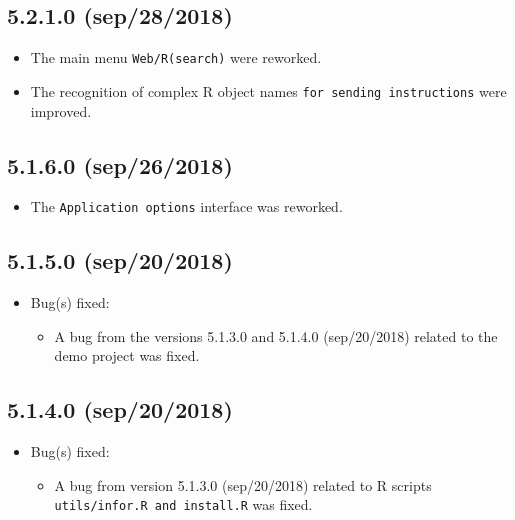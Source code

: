 \subsection*{5.2.1.0 (sep/28/2018)}
\begin{itemize}
  \item The main menu \texttt{Web/R(search)} were reworked.
  \item The recognition of complex R object names \texttt{for sending instructions} were improved.
\end{itemize}

\subsection*{5.1.6.0 (sep/26/2018)}
\begin{itemize}
  \item The \texttt{Application options} interface was reworked.
\end{itemize}

\subsection*{5.1.5.0 (sep/20/2018)}
\begin{itemize}
  \item Bug(s) fixed:
    \begin{itemize}
      \item A bug from the versions 5.1.3.0 and 5.1.4.0 (sep/20/2018) related to the demo project was fixed.
    \end{itemize}
\end{itemize}

\subsection*{5.1.4.0 (sep/20/2018)}
\begin{itemize}
  \item Bug(s) fixed:
    \begin{itemize}
      \item A bug from version 5.1.3.0 (sep/20/2018) related to R scripts \texttt{utils/infor.R and install.R} was fixed.
    \end{itemize}
\end{itemize}

